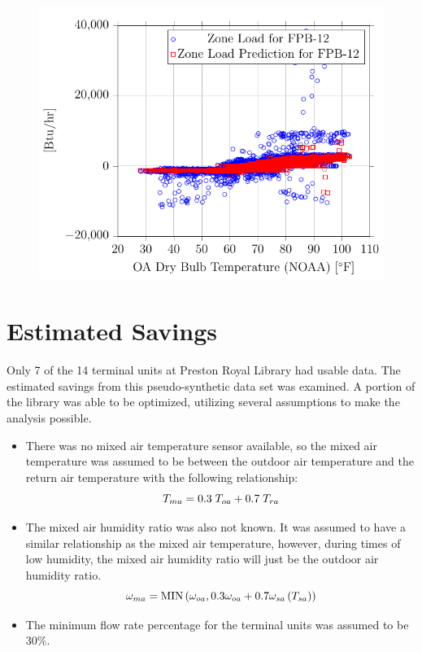 \begin{figure}
\centering
\includegraphics{Plots/43-PrestonRoyalFPB-12-ZoneLoad/2017-08-07-0928-BtuhrvsOADryBulbTemperatureNOAAF.pdf}
\caption{}
\label{fig:2017-08-07-0928-BtuhrvsOADryBulbTemperatureNOAAF12}
\end{figure}

\section{Estimated Savings}

Only 7 of the 14 terminal units at Preston Royal Library had usable     
data. The estimated savings from this pseudo-synthetic data set was     
examined. A portion of the library was able to be optimized, utilizing  
several assumptions to make the analysis possible.                      

\begin{itemize}
    \item There was no mixed air temperature sensor available, so the
        mixed air temperature was assumed to be between the outdoor air
        temperature and the return air temperature with the following
        relationship:
\begin{equation}
T_{ma}{} = 0.3\; T_{oa}{} + 0.7\; T_{ra}{}
\end{equation}
\item The mixed air humidity ratio was also not known. It was assumed to
    have a similar relationship as the mixed air temperature, however,
    during times of low humidity, the mixed air humidity ratio will just
    be the outdoor air humidity ratio.
\begin{equation}
    \omega_{ma} = \text{MIN}\left(\omega_{oa}, 0.3 \omega_{oa} + 0.7
    \omega_{sa}\left(T_{sa}{}\right) \right)
\end{equation}
\item The minimum flow rate percentage for the terminal units was
    assumed to be 30\%. 
\end{itemize}

